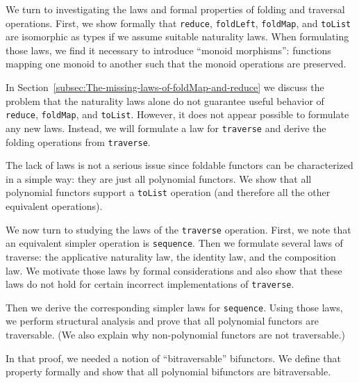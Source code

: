 We turn to investigating the laws and formal properties of folding
and traversal operations. First, we show formally that \lstinline!reduce!,
\lstinline!foldLeft!, \lstinline!foldMap!, and \lstinline!toList!
are isomorphic as types if we assume suitable naturality laws. When
formulating those laws, we find it necessary to introduce \textsf{``}monoid
morphisms\textsf{''}: functions mapping one monoid to another such that the
monoid operations are preserved.

In Section~\ref{subsec:The-missing-laws-of-foldMap-and-reduce} we
discuss the problem that the naturality laws alone do not guarantee
useful behavior of \lstinline!reduce!, \lstinline!foldMap!, and
\lstinline!toList!. However, it does not appear possible to formulate
any new laws. Instead, we will formulate a law for \lstinline!traverse!
and derive the folding operations from \lstinline!traverse!. 

The lack of laws is not a serious issue since foldable functors can
be characterized in a simple way: they are just all polynomial functors.
We show that all polynomial functors support a \lstinline!toList!
operation (and therefore all the other equivalent operations).

We now turn to studying the laws of the \lstinline!traverse! operation.
First, we note that an equivalent simpler operation is \lstinline!sequence!.
Then we formulate several laws of traverse: the applicative naturality
law, the identity law, and the composition law. We motivate those
laws by formal considerations and also show that these laws do not
hold for certain incorrect implementations of \lstinline!traverse!.

Then we derive the corresponding simpler laws for \lstinline!sequence!.
Using those laws, we perform structural analysis and prove that all
polynomial functors are traversable. (We also explain why non-polynomial
functors are not traversable.)

In that proof, we needed a notion of \textsf{``}bitraversable\textsf{''} bifunctors.
We define that property formally and show that all polynomial bifunctors
are bitraversable.

